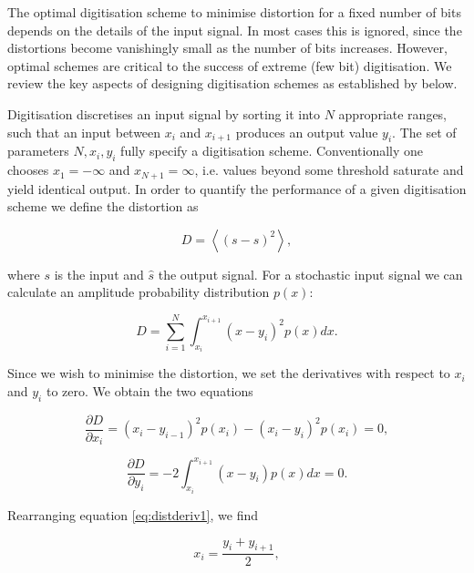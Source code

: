 \documentclass[apj]{emulateapj}
\begin{document}
The optimal digitisation scheme to minimise distortion for a fixed number of bits depends on the details of the input signal. In most cases this is ignored, since the distortions become vanishingly small as the number of bits increases. However, optimal schemes are critical to the success of extreme (few bit) digitisation. We review the key aspects of designing digitisation schemes as established by \cite{max1960} below.

Digitisation discretises an input signal by sorting it into $N$ appropriate ranges, such that an input between $x_i$ and $x_{i+1}$ produces an output value $y_i$. The set of parameters $N, x_i, y_i$ fully specify a digitisation scheme. Conventionally one chooses $x_{1} = -\infty$ and $x_{N+1} = \infty$, i.e. values beyond some threshold saturate and yield identical output. In order to quantify the performance of a given digitisation scheme we define the distortion as

\begin{equation} D = \left\langle  \left( s - \hat{s} \right)^2 \right\rangle, \end{equation}

where $s$ is the input and $\hat{s}$ the output signal. For a stochastic input signal we can calculate an amplitude probability distribution $p(x)$:

\begin{equation} D = \sum_{i = 1}^N \int_{x_i}^{x_{i+1}} \left(x-y_i\right)^2 p(x) dx. \end{equation}

Since we wish to minimise the distortion, we set the derivatives with respect to $x_i$ and $y_i$ to zero. We obtain the two equations

\begin{equation} \label{eq:distderiv1}
\frac{\partial D}{\partial x_i} = \left(x_i-y_{i-1}\right)^2 p(x_i) - \left(x_i - y_i\right)^2 p(x_i) = 0,
\end{equation}

\begin{equation} \label{eq:distderiv2}
\frac{\partial D}{\partial y_i} = -2 \int_{x_i}^{x_{i+1}} \left( x-y_i \right) p(x) dx = 0.
\end{equation}

Rearranging equation \ref{eq:distderiv1}, we find

\begin{equation} \label{eq:digitequalspacecondition}
x_i = \frac{y_i+y_{i+1}}{2},
\end{equation}
\end{document}
